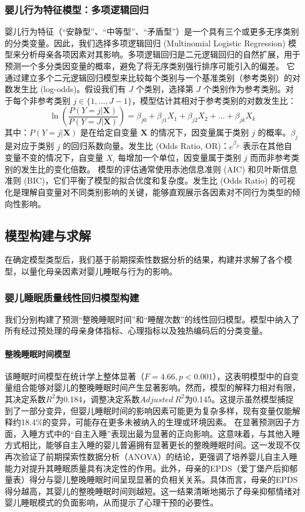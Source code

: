 \documentclass[withoutpreface,bwprint]{cumcmthesis}
\begin{document}
\subsubsection{婴儿行为特征模型：多项逻辑回归}
婴儿行为特征（“安静型”、“中等型”、“矛盾型”）是一个具有三个或更多无序类别的分类变量。因此，我们选择多项逻辑回归 (Multinomial Logistic Regression) 模型来分析母亲各项因素对其影响。多项逻辑回归是二元逻辑回归的自然扩展，用于预测一个多分类因变量的概率，避免了将无序类别强行排序可能引入的偏差。
它通过建立多个二元逻辑回归模型来比较每个类别与一个基准类别（参考类别）的对数发生比 (log-odds)。假设我们有 $J$ 个类别，选择第 $J$ 个类别作为参考类别。对于每个非参考类别 $j \in \{1, \dots, J-1\}$，模型估计其相对于参考类别的对数发生比：
$$ \ln\left(\frac{P(Y=j | \mathbf{X})}{P(Y=J | \mathbf{X})}\right) = \beta_{j0} + \beta_{j1} X_1 + \beta_{j2} X_2 + \dots + \beta_{jk} X_k $$
其中：$P(Y=j | \mathbf{X})$ 是在给定自变量 $\mathbf{X}$ 的情况下，因变量属于类别 $j$ 的概率。$\beta_{j}$ 是对应于类别 $j$ 的回归系数向量。发生比 (Odds Ratio, OR)：$e^{\beta_{ji}}$ 表示在其他自变量不变的情况下，自变量 $X_i$ 每增加一个单位，因变量属于类别 $j$ 而而非参考类别的发生比的变化倍数。
模型的评估通常使用赤池信息准则 (AIC) 和贝叶斯信息准则 (BIC)，它们平衡了模型的拟合优度和复杂度。发生比 (Odds Ratio) 的可视化是理解自变量对不同类别影响的关键，能够直观展示各因素对不同行为类型的倾向性影响。

\subsection{模型构建与求解}
在确定模型类型后，我们基于前期探索性数据分析的结果，构建并求解了各个模型，以量化母亲因素对婴儿睡眠与行为的影响。

\subsubsection{婴儿睡眠质量线性回归模型构建}
我们分别构建了预测“整晚睡眠时间”和“睡醒次数”的线性回归模型。模型中纳入了所有经过预处理的母亲身体指标、心理指标以及独热编码后的分类变量。

\paragraph{整晚睡眠时间模型}
该睡眠时间模型在统计学上整体显著（$F=4.66, p < 0.001$），这表明模型中的自变量组合能够对婴儿的整晚睡眠时间产生显著影响。然而，模型的解释力相对有限，其决定系数$R^2$为0.184，调整决定系数$Adjusted~R^2$为0.145。这提示虽然模型捕捉到了一部分变异，但婴儿睡眠时间的影响因素可能更为复杂多样，现有变量仅能解释约18.4\%的变异，可能存在更多未被纳入的生理或环境因素。
在显著预测因子方面，入睡方式中的“自主入睡”表现出最为显著的正向影响。这意味着，与其他入睡方式相比，能够自主入睡的婴儿普遍拥有显著更长的整晚睡眠时间。这一发现不仅再次验证了前期探索性数据分析（ANOVA）的结论，更强调了培养婴儿自主入睡能力对提升其睡眠质量具有决定性的作用。此外，母亲的EPDS（爱丁堡产后抑郁量表）得分与婴儿整晚睡眠时间呈现显著的负相关关系。具体而言，母亲的EPDS得分越高，其婴儿的整晚睡眠时间则越短。这一结果清晰地揭示了母亲抑郁情绪对婴儿睡眠模式的负面影响，从而提示了心理干预的必要性。
\end{document}
